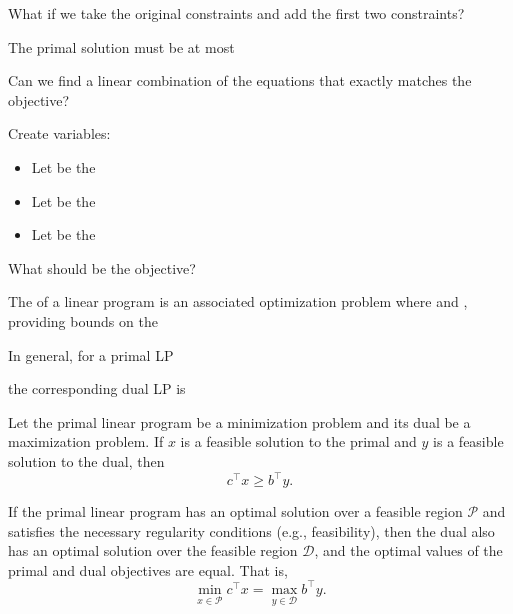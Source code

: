 \documentclass[11  pt]{article}
\begin{document}
\vs{2cm}
What if we take the original constraints and add
the first two constraints?

\vs{2cm}
The primal solution must be at most 

\vs{2cm}
Can we find a linear combination of the equations that exactly matches the objective?

Create variables:
\begin{itemize}
\item
Let  be the 
\item
Let  be the 
\item
Let  be the 
\end{itemize}

\vs{1cm}
What should be the objective?

\vfill
\newpage

The  of a linear program is an associated optimization problem where  and , providing bounds on the 

\vs{1cm}
In general, for a primal LP

\vs{6cm}
the corresponding dual LP is

\vs{6cm}
\begin{theorem}
Let the primal linear program be a minimization problem and its dual be a maximization problem. If \( x \) is a feasible solution to the primal and \( y \) is a feasible solution to the dual, then
\[
c^\top x \geq b^\top y.
\]
\end{theorem}

\begin{theorem}
If the primal linear program has an optimal solution over a feasible region $\mathcal{P}$ and satisfies the necessary regularity conditions (e.g., feasibility), then the dual also has an optimal solution over the feasible region $\mathcal{D}$, and the optimal values of the primal and dual objectives are equal. That is,
\[
\min_{x \in \mathcal{P}} c^\top x = \max_{y \in \mathcal{D}} b^\top y.
\]
\end{theorem}
\end{document}

